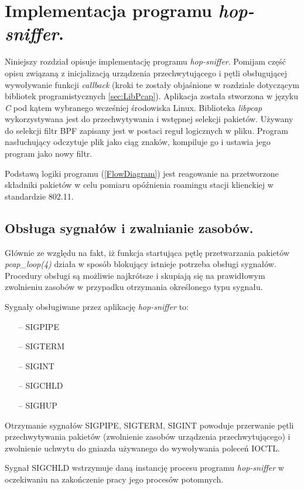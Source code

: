 \section{Implementacja programu \emph{hop-sniffer}.}

Niniejszy rozdział opisuje implementację programu \emph{hop-sniffer}. Pomijam część opisu związaną z inicjalizacją urządzenia przechwytującego i pętli obsługującej wywoływanie funkcji \emph{callback} (kroki te zostały objaśnione w rozdziale dotyczącym bibliotek programistycznych \ref{sec:LibPcap}). Aplikacja została stworzona w języku \emph{C} pod kątem wybranego wcześniej środowiska Linux. Biblioteka \emph{libpcap} wykorzystywana jest do przechwytywania i wstępnej selekcji pakietów. Używany do selekcji filtr BPF zapisany jest w postaci reguł logicznych w pliku. Program nasłuchujący odczytuje plik jako ciąg znaków, kompiluje go i ustawia jego program jako nowy filtr.   

Podstawą logiki programu (\ref{FlowDiagram}) jest reagowanie na przetworzone składniki pakietów w celu pomiaru opóźnienia roamingu stacji klienckiej w standardzie 802.11.   

\subsection{Obsługa sygnałów i zwalnianie zasobów.}

Głównie ze względu na fakt, iż funkcja startująca pętlę przetwarzania pakietów \emph{pcap\_loop(4)} działa w sposób blokujący istnieje potrzeba obsługi sygnałów. Procedury obsługi są możliwie najkrótsze i skupiają się na prawidłowym zwolnieniu zasobów w przypadku otrzymania określonego typu sygnału. 

Sygnały obsługiwane przez aplikację \emph{hop-sniffer} to:
\begin{itemize}
\item[--] SIGPIPE
\item[--] SIGTERM
\item[--] SIGINT
\item[--] SIGCHLD
\item[--] SIGHUP
\end{itemize}

Otrzymanie sygnałów SIGPIPE, SIGTERM, SIGINT powoduje przerwanie pętli przechwytywania pakietów (zwolnienie zasobów urządzenia przechwytującego) i zwolnienie uchwytu do gniazda używanego do wywoływania poleceń IOCTL. 

Sygnał SIGCHLD wstrzymuje daną instancję procesu programu \emph{hop-sniffer} w oczekiwaniu na zakończenie pracy jego procesów potomnych. 

